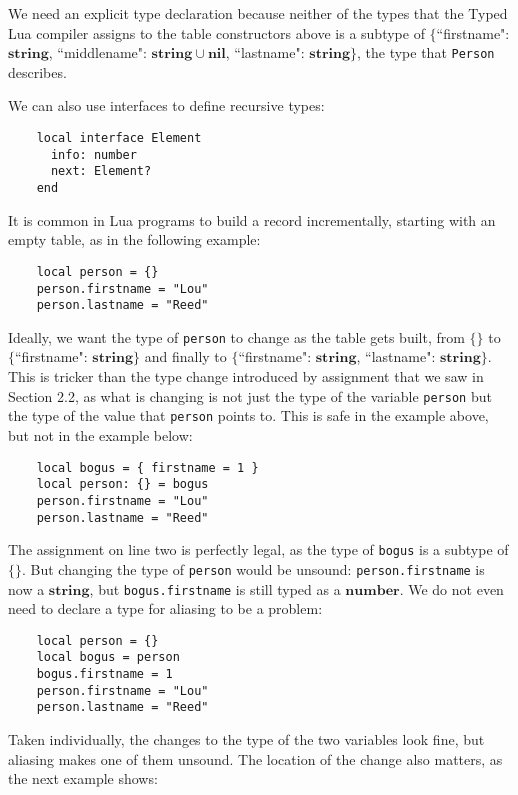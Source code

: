 \documentclass{sig-alternate}
\newcommand{\Nil}{\mathbf{nil}}
\newcommand{\Number}{\mathbf{number}}
\newcommand{\String}{\mathbf{string}}
\begin{document}
We need an explicit type declaration because neither of
the types that the Typed Lua compiler assigns to the
table constructors above is a subtype of $\{$``firstname":
$\String$, ``middlename": $\String \cup \Nil$, ``lastname":
$\String\}$, the type that {\tt Person} describes.

We can also use interfaces to define recursive types:

\begin{verbatim}
    local interface Element
      info: number
      next: Element?
    end
\end{verbatim}

It is common in Lua programs to build a record incrementally,
starting with an empty table, as in the following example:

\begin{verbatim}
    local person = {}
    person.firstname = "Lou"
    person.lastname = "Reed"
\end{verbatim}

Ideally, we want the type of {\tt person} to change as the
table gets built, from $\{\}$ to $\{$``firstname": $\String\}$
and finally to $\{$``firstname": $\String$, ``lastname":
 $\String\}$. This is tricker than the type change introduced
by assignment that we saw in Section 2.2, as what is changing
is not just the type of the variable {\tt person} but the
type of the value that {\tt person} points to. This is safe
in the example above, but not in the example below:

\begin{verbatim}
    local bogus = { firstname = 1 }
    local person: {} = bogus
    person.firstname = "Lou"
    person.lastname = "Reed"
\end{verbatim}

The assignment on line two is perfectly legal, as the type
of {\tt bogus} is a subtype of $\{\}$. But changing the type
of {\tt person} would be unsound: {\tt person.firstname} is
now a $\String$, but {\tt bogus.firstname} is still typed
as a $\Number$. We do not even need to declare a type for
aliasing to be a problem: 

\begin{verbatim}
    local person = {}
    local bogus = person
    bogus.firstname = 1
    person.firstname = "Lou"
    person.lastname = "Reed"
\end{verbatim}

Taken individually, the changes to the type of the two
variables look fine, but aliasing makes one of them unsound.
The location of the change also matters, as the next example
shows:
\end{document}
